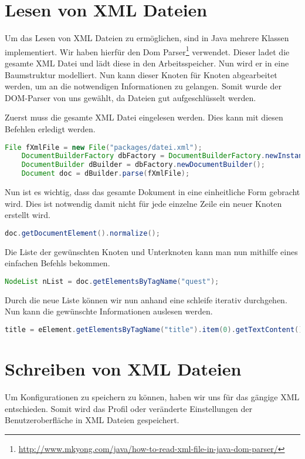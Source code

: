 \section{Lesen von XML Dateien}
Um das Lesen von XML Dateien zu ermöglichen, sind in Java mehrere Klassen implementiert. Wir haben hierfür den Dom Parser\footnote{\url{http://www.mkyong.com/java/how-to-read-xml-file-in-java-dom-parser/}} verwendet. Dieser ladet die gesamte XML Datei und lädt diese in den Arbeitsspeicher. Nun wird er in eine Baumstruktur modelliert. Nun kann dieser Knoten für Knoten abgearbeitet werden, um an die notwendigen Informationen zu gelangen. Somit wurde der DOM-Parser von uns gewählt, da Dateien gut aufgeschlüsselt werden.

Zuerst muss die gesamte XML Datei eingelesen werden. Dies kann mit diesen Befehlen erledigt werden.
\begin{lstlisting}[language=JAVA]
	File fXmlFile = new File("packages/datei.xml");
	DocumentBuilderFactory dbFactory = DocumentBuilderFactory.newInstance();
	DocumentBuilder dBuilder = dbFactory.newDocumentBuilder();
	Document doc = dBuilder.parse(fXmlFile);
\end{lstlisting}

Nun ist es wichtig, dass das gesamte Dokument in eine einheitliche Form gebracht wird. Dies ist notwendig damit nicht für jede einzelne Zeile ein neuer Knoten erstellt wird.
\begin{lstlisting}[language=JAVA]
	doc.getDocumentElement().normalize();
\end{lstlisting}

Die Liste der gewünschten Knoten und Unterknoten kann man nun mithilfe eines einfachen Befehls bekommen.
\begin{lstlisting}[language=JAVA]
	NodeList nList = doc.getElementsByTagName("quest");
\end{lstlisting}
Durch die neue Liste können wir nun anhand eine schleife iterativ durchgehen. Nun kann die gewünschte Informationen auslesen werden. 
\begin{lstlisting}[language=JAVA]
title = eElement.getElementsByTagName("title").item(0).getTextContent();
\end{lstlisting}

\section{Schreiben von XML Dateien}
Um Konfigurationen zu speichern zu können, haben wir uns für das gängige XML entschieden. Somit wird das Profil oder veränderte Einstellungen der Benutzeroberfläche in XML Dateien gespeichert.

